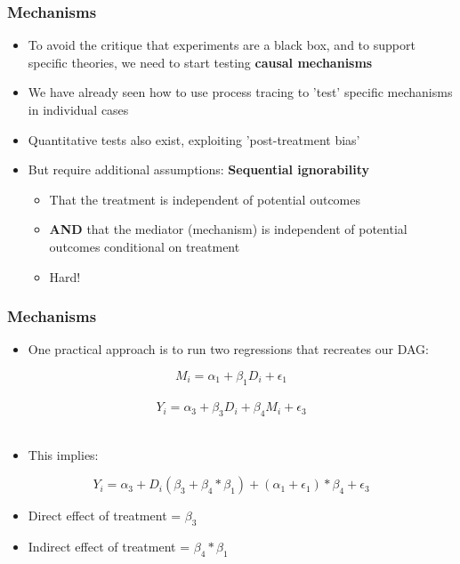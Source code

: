 \documentclass[xcolor=x11names,compress]{beamer}\usepackage[]{graphicx}\usepackage[]{color}
\renewcommand{\(}{\begin{columns}}
\renewcommand{\)}{\end{columns}}
\newcommand{\<}[1]{\begin{column}{#1}}
\renewcommand{\>}{\end{column}}
\begin{document}
\begin{frame}
\frametitle{Mechanisms}
\begin{itemize}
\item To avoid the critique that experiments are a black box, and to support specific theories, we need to start testing \textbf{causal mechanisms}
\pause
\item We have already seen how to use process tracing to 'test' specific mechanisms in individual cases
\pause
\item Quantitative tests also exist, exploiting 'post-treatment bias'
\pause
\item But require additional assumptions: \textbf{Sequential ignorability}
\begin{itemize}
\item That the treatment is independent of potential outcomes
\pause
\item \textbf{AND} that the mediator (mechanism) is independent of potential outcomes conditional on treatment
\pause
\item Hard!
\end{itemize}
\end{itemize}
\end{frame}

\begin{frame}
\frametitle{Mechanisms}
\begin{itemize}
\item One practical approach is to run two regressions that recreates our DAG:
\end{itemize}
$$M_i = \alpha_1 + \beta_1 D_i + \epsilon_1$$ \\
$$Y_i = \alpha_3 + \beta_3 D_i + \beta_4 M_i + \epsilon_3$$ \\
\begin{itemize}
\item This implies:
\end{itemize}
$$Y_i = \alpha_3 + D_i (\beta_3+\beta_4*\beta_1) + (\alpha_1 +\epsilon_1)*\beta_4 + \epsilon_3$$
\pause
\begin{itemize}
\item Direct effect of treatment = $\beta_3$
\pause
\item Indirect effect of treatment = $\beta_4*\beta_1$
\end{itemize}
\end{frame}
\end{document}
